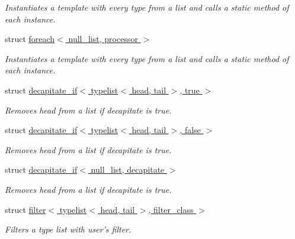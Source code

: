 \begin{DoxyCompactItemize}
\begin{DoxyCompactList}\small\item\em Instantiates a template with every type from a list and calls a static method of each instance. \item\end{DoxyCompactList}\item 
struct \hyperlink{structavrpp_1_1typelist_1_1foreach_3_01null__list_00_01processor_01_4}{foreach$<$ null\_\-list, processor $>$}
\begin{DoxyCompactList}\small\item\em Instantiates a template with every type from a list and calls a static method of each instance. \item\end{DoxyCompactList}\item 
struct \hyperlink{structavrpp_1_1typelist_1_1decapitate__if_3_01typelist_3_01head_00_01tail_01_4_00_01true_01_4}{decapitate\_\-if$<$ typelist$<$ head, tail $>$, true $>$}
\begin{DoxyCompactList}\small\item\em Removes head from a list if decapitate is true. \item\end{DoxyCompactList}\item 
struct \hyperlink{structavrpp_1_1typelist_1_1decapitate__if_3_01typelist_3_01head_00_01tail_01_4_00_01false_01_4}{decapitate\_\-if$<$ typelist$<$ head, tail $>$, false $>$}
\begin{DoxyCompactList}\small\item\em Removes head from a list if decapitate is true. \item\end{DoxyCompactList}\item 
struct \hyperlink{structavrpp_1_1typelist_1_1decapitate__if_3_01null__list_00_01decapitate_01_4}{decapitate\_\-if$<$ null\_\-list, decapitate $>$}
\begin{DoxyCompactList}\small\item\em Removes head from a list if decapitate is true. \item\end{DoxyCompactList}\item 
struct \hyperlink{structavrpp_1_1typelist_1_1filter_3_01typelist_3_01head_00_01tail_01_4_00_01filter__class_01_4}{filter$<$ typelist$<$ head, tail $>$, filter\_\-class $>$}
\begin{DoxyCompactList}\small\item\em Filters a type list with user's filter. \item\end{DoxyCompactList}\item 

\end{DoxyCompactItemize}
